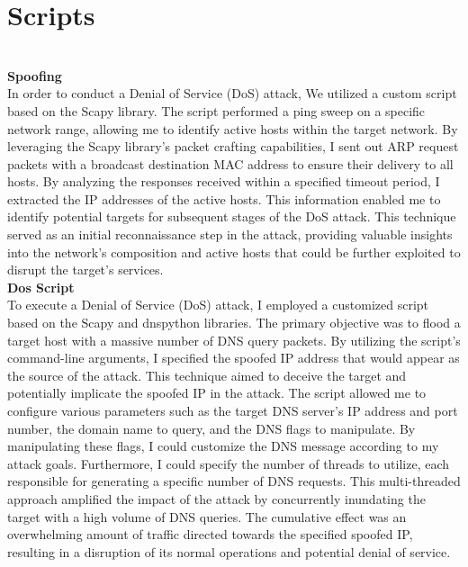 \section{Scripts}
\\
\textbf{Spoofing}\\
In order to conduct a Denial of Service (DoS) attack, We utilized a custom script based on the Scapy library. The script performed a ping sweep on a specific network range, allowing me to identify active hosts within the target network. By leveraging the Scapy library's packet crafting capabilities, I sent out ARP request packets with a broadcast destination MAC address to ensure their delivery to all hosts. By analyzing the responses received within a specified timeout period, I extracted the IP addresses of the active hosts. This information enabled me to identify potential targets for subsequent stages of the DoS attack. This technique served as an initial reconnaissance step in the attack, providing valuable insights into the network's composition and active hosts that could be further exploited to disrupt the target's services.
\\
\textbf{Dos Script}\\
To execute a Denial of Service (DoS) attack, I employed a customized script based on the Scapy and dnspython libraries. The primary objective was to flood a target host with a massive number of DNS query packets. By utilizing the script's command-line arguments, I specified the spoofed IP address that would appear as the source of the attack. This technique aimed to deceive the target and potentially implicate the spoofed IP in the attack. The script allowed me to configure various parameters such as the target DNS server's IP address and port number, the domain name to query, and the DNS flags to manipulate. By manipulating these flags, I could customize the DNS message according to my attack goals. Furthermore, I could specify the number of threads to utilize, each responsible for generating a specific number of DNS requests. This multi-threaded approach amplified the impact of the attack by concurrently inundating the target with a high volume of DNS queries. The cumulative effect was an overwhelming amount of traffic directed towards the specified spoofed IP, resulting in a disruption of its normal operations and potential denial of service.
